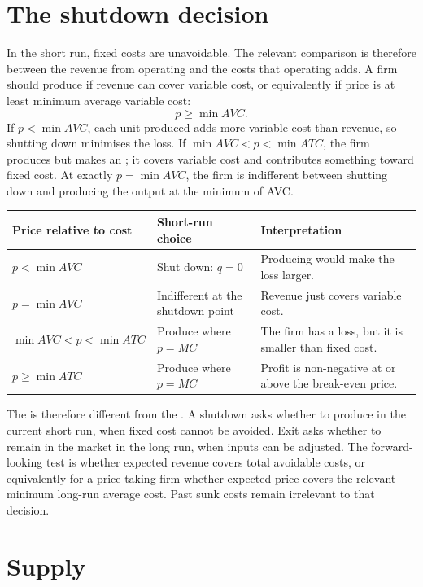 \section{The shutdown decision}

In the short run, fixed costs are unavoidable. The relevant comparison is
therefore between the revenue from operating and the costs that operating
adds. A firm should produce if revenue can cover variable cost, or equivalently
if price is at least minimum average variable cost:
\[
p\geq\min AVC.
\]
If $p<\min AVC$, each unit produced adds more variable cost than revenue, so
shutting down minimises the loss. If $\min AVC<p<\min ATC$, the firm produces
but makes an ; it covers variable cost and contributes
something toward fixed cost. At exactly $p=\min AVC$, the firm is indifferent
between shutting down and producing the output at the minimum of AVC.

\begin{center}
\small
\begin{tabular}{p{}p{}p{}}
\toprule
Price relative to cost & Short-run choice & Interpretation \\
\midrule
$p<\min AVC$ & Shut down: $q=0$ & Producing would make the loss larger. \\
$p=\min AVC$ & Indifferent at the shutdown point & Revenue just covers variable cost. \\
$\min AVC<p<\min ATC$ & Produce where $p=MC$ & The firm has a loss, but it is smaller than fixed cost. \\
$p\geq\min ATC$ & Produce where $p=MC$ & Profit is non-negative at or above the break-even price. \\
\bottomrule
\end{tabular}
\end{center}

The  is therefore different from the . A shutdown asks whether to produce in the current short run, when
fixed cost cannot be avoided. Exit asks whether to remain in the market in the
long run, when inputs can be adjusted. The forward-looking test is whether
expected revenue covers total avoidable costs, or equivalently for a
price-taking firm whether expected price covers the relevant minimum long-run
average cost. Past sunk costs remain irrelevant to that decision.

\section{Supply}

